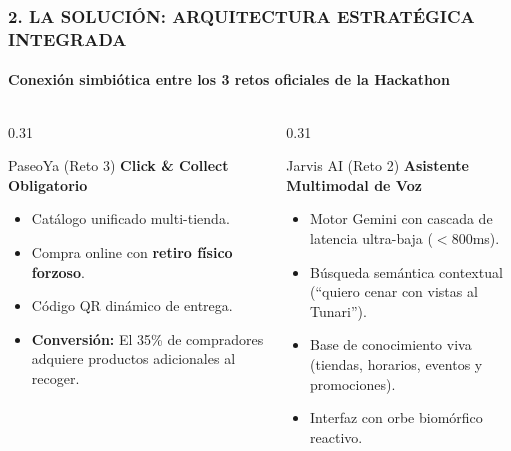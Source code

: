 \documentclass[aspectratio=169, 10pt]{beamer}
\begin{document}
\begin{frame}
  \frametitle{2. LA SOLUCIÓN: ARQUITECTURA ESTRATÉGICA INTEGRADA}
  \framesubtitle{Conexión simbiótica entre los 3 retos oficiales de la Hackathon}

  \begin{columns}[T]
    \begin{column}{0.31\textwidth}
      \begin{alertblock}{PaseoYa (Reto 3)}
        \scriptsize
        \textbf{Click \& Collect Obligatorio}
        \begin{itemize}\setlength\itemsep{0.25em}
          \item Catálogo unificado multi-tienda.
          \item Compra online con \textbf{retiro físico forzoso}.
          \item Código QR dinámico de entrega.
          \item \textbf{Conversión:} El 35\% de compradores adquiere productos adicionales al recoger.
        \end{itemize}
      \end{alertblock}
    \end{column}

    \begin{column}{0.31\textwidth}
      \begin{block}{Jarvis AI (Reto 2)}
        \scriptsize
        \textbf{Asistente Multimodal de Voz}
        \begin{itemize}\setlength\itemsep{0.25em}
          \item Motor Gemini con cascada de latencia ultra-baja ($<$800ms).
          \item Búsqueda semántica contextual (``quiero cenar con vistas al Tunari'').
          \item Base de conocimiento viva (tiendas, horarios, eventos y promociones).
          \item Interfaz con orbe biomórfico reactivo.
        \end{itemize}
      \end{block}
    \end{column}


\end{columns}
\end{frame}
\end{document}
